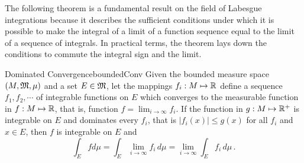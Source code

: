 The following theorem is a fundamental result on the field of Labesgue integrations because it describes the sufficient conditions under which it is possible to make the integral of a limit of a function sequence equal to the limit of a sequence of integrals. In practical terms, the theorem lays down the conditions to commute the integral sign and the limit. 
\begin{mteo}{Dominated Convergence}{boundedConv}
Given the bounded measure space $(M,\mathfrak{M},\mu)$ and a set $E\in\mathfrak{M}$, let the mappings $f_i : M \mapsto \mathbb{R}$ define a sequence $f_1,f_2,\cdots$ of integrable functions on $E$ which converges to the measurable function in $f : M \mapsto \mathbb{R}$, that is, function $f=\lim_{i\to \infty} f_i$. If the function in $g : M \mapsto \mathbb{R}^+$ is integrable on $E$ and dominates every $f_i$, that is $|f_i(x)|\leqslant g(x)$ for all $f_i$ and $x\in E$, then $f$ is integrable on $E$ and 
\begin{equation*}
 \int_E f d\mu= \int_E \lim_{i\to \infty}f_i\, d\mu=\lim_{i\to \infty} \int_E f_i\, d\mu\,.
 \end{equation*} 
\end{mteo}
